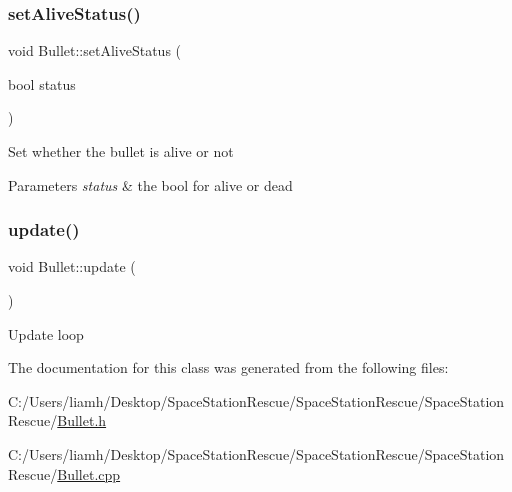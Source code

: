 \subsubsection{\texorpdfstring{setAliveStatus()}{setAliveStatus()}}
{\footnotesize\ttfamily void Bullet\+::set\+Alive\+Status (\begin{DoxyParamCaption}\item[{bool}]{status }\end{DoxyParamCaption})}



Set whether the bullet is alive or not 


\begin{DoxyParams}{Parameters}
{\em status} & the bool for alive or dead\\
\hline
\end{DoxyParams}
\mbox{\label{class_bullet_a32f4a0611fe2dd245fee955d14ca1f68}} 
\subsubsection{\texorpdfstring{update()}{update()}}
{\footnotesize\ttfamily void Bullet\+::update (\begin{DoxyParamCaption}{ }\end{DoxyParamCaption})}



Update loop 



The documentation for this class was generated from the following files\+:\begin{DoxyCompactItemize}
\item 
C\+:/\+Users/liamh/\+Desktop/\+Space\+Station\+Rescue/\+Space\+Station\+Rescue/\+Space\+Station\+Rescue/\mbox{\hyperlink{_bullet_8h}{Bullet.\+h}}\item 
C\+:/\+Users/liamh/\+Desktop/\+Space\+Station\+Rescue/\+Space\+Station\+Rescue/\+Space\+Station\+Rescue/\mbox{\hyperlink{_bullet_8cpp}{Bullet.\+cpp}}\end{DoxyCompactItemize}

